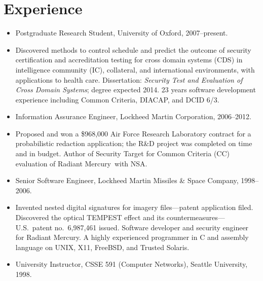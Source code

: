 \documentclass[12pt,twoside,letterpaper]{article}
\providecommand{\rmtrademark}{\raisebox{\height}{\tiny (TM)}}
\newenvironment{myquote}{\list{}{\leftmargin=0.25in\rightmargin=0in}\item[]}{\endlist}
\begin{document}
\section*{Experience}
\vspace{-2mm}
\begin{itemize}
	\item Postgraduate Research Student, University of Oxford, 2007--present.
		\vspace{-2mm}
		\begin{myquote}
			Discovered methods to control schedule and predict the outcome of
			security certification and accreditation 
			testing for cross domain systems (CDS) in intelligence community
			(IC), collateral, and international environments, with applications
			to health care.
			Dissertation: \emph{Security Test and Evaluation of Cross Domain
			Systems}; degree expected 2014.  23 years software development
			experience including Common Criteria, DIACAP, and DCID 6/3.
		\end{myquote}
\vspace{-2.5mm}
	\item Information Assurance Engineer, Lockheed Martin Corporation, 2006--2012.
		\vspace{-2mm}
		\begin{myquote}
			Proposed and won a \$968,000 Air Force Research Laboratory contract
			for a probabilistic redaction application; the R\&D project was completed
			on time and in budget.  Author of Security Target for Common Criteria
			(CC) evaluation of Radiant Mercury\rmtrademark\ with
			NSA.
		\end{myquote}
\vspace{-2.5mm}
	\item Senior Software Engineer, Lockheed Martin Missiles \& Space Company, 1998--2006.
		\vspace{-2mm}
		\begin{myquote}
			Invented nested digital signatures for imagery files---patent application filed.
			Discovered the optical TEMPEST effect and its countermeasures---U.S.\ patent
			no.\ 6,987,461 issued.  Software developer and security engineer for
			Radiant Mercury\rmtrademark.  A highly experienced programmer in C and assembly
			language on UNIX, X11, FreeBSD, and Trusted Solaris.
		\end{myquote}
\vspace{-2.5mm}
    \item University Instructor, CSSE 591 (Computer Networks), Seattle University, 1998.
\end{itemize}
\end{document}
